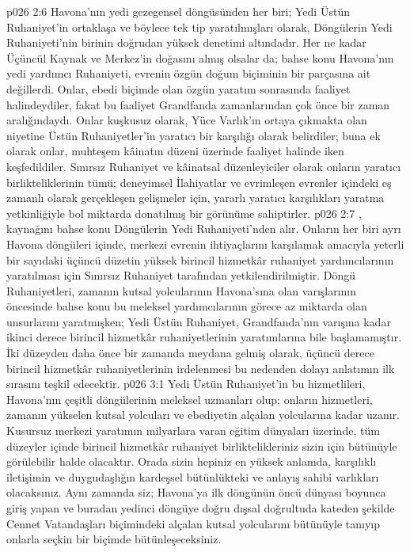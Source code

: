 \vs p026 2:6 Havona’nın yedi gezegensel döngüsünden her biri; Yedi Üstün Ruhaniyet’in ortaklaşa ve böylece tek tip yaratılmışları olarak, Döngülerin Yedi Ruhaniyeti’nin birinin doğrudan yüksek denetimi altındadır. Her ne kadar Üçüncül Kaynak ve Merkez’in doğasını almış olsalar da; bahse konu Havona’nın yedi yardımcı Ruhaniyeti, evrenin özgün doğum biçiminin bir parçasına ait değillerdi. Onlar, ebedi biçimde olan özgün yaratım sonrasında faaliyet halindeydiler, fakat bu faaliyet Grandfanda zamanlarından çok önce bir zaman aralığındaydı. Onlar kuşkusuz olarak, Yüce Varlık’ın ortaya çıkmakta olan niyetine Üstün Ruhaniyetler’in yaratıcı bir karşılığı olarak belirdiler; buna ek olarak onlar, muhteşem kâinatın düzeni üzerinde faaliyet halinde iken keşfedildiler. Sınırsız Ruhaniyet ve kâinatsal düzenleyiciler olarak onların yaratıcı birlikteliklerinin tümü; deneyimsel İlahiyatlar ve evrimleşen evrenler içindeki eş zamanlı olarak gerçekleşen gelişmeler için, yararlı yaratıcı karşılıkları yaratma yetkinliğiyle bol miktarda donatılmış bir görünüme sahiptirler.
\vs p026 2:7 , kaynağını bahse konu Döngülerin Yedi Ruhaniyeti’nden alır. Onların her biri ayrı Havona döngüleri içinde, merkezi evrenin ihtiyaçlarını karşılamak amacıyla yeterli bir sayıdaki üçüncü düzetin yüksek birincil hizmetkâr ruhaniyet yardımcılarının yaratılması için Sınırsız Ruhaniyet tarafından yetkilendirilmiştir. Döngü Ruhaniyetleri, zamanın kutsal yolcularının Havona’sına olan varışlarının öncesinde bahse konu bu meleksel yardımcılarının görece az miktarda olan unsurlarını yaratmışken; Yedi Üstün Ruhaniyet, Grandfanda’nın varışına kadar ikinci derece birincil hizmetkâr ruhaniyetlerinin yaratımlarına bile başlamamıştır. İki düzeyden daha önce bir zamanda meydana gelmiş olarak, üçüncü derece birincil hizmetkâr ruhaniyetlerinin irdelenmesi bu nedenden dolayı anlatımın ilk sırasını teşkil edecektir.
\vs p026 3:1 Yedi Üstün Ruhaniyet’in bu hizmetlileri, Havona’nın çeşitli döngülerinin meleksel uzmanları olup; onların hizmetleri, zamanın yükselen kutsal yolcuları ve ebediyetin alçalan yolcularına kadar uzanır. Kusursuz merkezi yaratımın milyarlara varan eğitim dünyaları üzerinde, tüm düzeyler içinde birincil hizmetkâr ruhaniyet birliktelikleriniz sizin için bütünüyle görülebilir halde olacaktır. Orada sizin hepiniz en yüksek anlamda, karşılıklı iletişimin ve duygudaşlığın kardeşsel bütünlükteki ve anlayış sahibi varlıkları olacaksınız. Aynı zamanda siz; Havona’ya ilk döngünün öncü dünyası boyunca giriş yapan ve buradan yedinci döngüye doğru dışsal doğrultuda kateden şekilde Cennet Vatandaşları biçimindeki alçalan kutsal yolcularını bütünüyle tanıyıp onlarla seçkin bir biçimde bütünleşeceksiniz.
